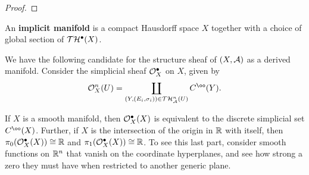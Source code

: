 \begin{proof}

\end{proof}

\begin{definition}\label{implicit-manifold}
An {\bf implicit manifold} is a compact Hausdorff space $X$ together with a choice of global section of $\mathcal T \mathcal H^\bullet(X)$. 
\end{definition}

We have the following candidate for the structure sheaf of $(X, \mathcal A)$ as a derived manifold. Consider the simplicial sheaf $\mathcal O_X^\bullet$ on $X$, given by
\[ \cO_X^n(U) = \coprod_{(Y, (E_i, \sigma_i)) \in \cT \cH_\cA^n(U)} C^\oo(Y). \]


\begin{speculation}
If $X$ is a smooth manifold, then $\mathcal O_X^\bullet(X)$ is equivalent to the discrete simplicial set $C^\oo(X)$. Further, if $X$ is the intersection of the origin in $\mathbb R$ with itself, then $\pi_0(\mathcal O_X^\bullet(X)) \cong \mathbb R$ and $\pi_1(\mathcal O_X^\bullet(X)) \cong \mathbb R$. To see this last part, consider smooth functions on $\mathbb R^n$ that vanish on the coordinate hyperplanes, and see how strong a zero they must have when restricted to another generic plane.
\end{speculation}